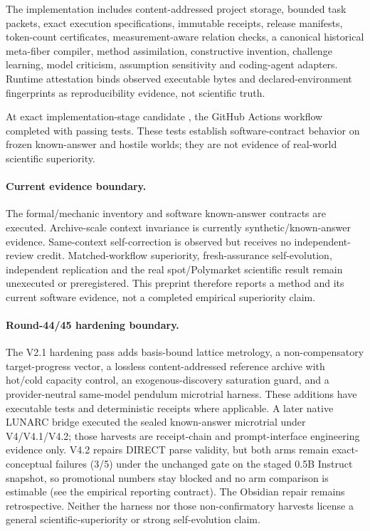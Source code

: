 The implementation includes content-addressed project storage, bounded task packets, exact execution specifications, immutable receipts, release manifests, token-count certificates, measurement-aware relation checks, a canonical historical meta-fiber compiler, method assimilation, constructive invention, challenge learning, model criticism, assumption sensitivity and coding-agent adapters. Runtime attestation binds observed executable bytes and declared-environment fingerprints as reproducibility evidence, not scientific truth.

At exact implementation-stage candidate \ImplementationSHA{}, the GitHub Actions workflow completed with \SoftwareTests{} passing tests. These tests establish software-contract behavior on frozen known-answer and hostile worlds; they are not evidence of real-world scientific superiority.

\paragraph{Current evidence boundary.} The formal/mechanic inventory and software known-answer contracts are executed. Archive-scale context invariance is currently synthetic/known-answer evidence. Same-context self-correction is observed but receives no independent-review credit. Matched-workflow superiority, fresh-assurance self-evolution, independent replication and the real spot/Polymarket scientific result remain unexecuted or preregistered. This preprint therefore reports a method and its current software evidence, not a completed empirical superiority claim.


\paragraph{Round-44/45 hardening boundary.}
The V2.1 hardening pass adds basis-bound lattice metrology, a non-compensatory target-progress vector, a lossless content-addressed reference archive with hot/cold capacity control, an exogenous-discovery saturation guard, and a provider-neutral same-model pendulum microtrial harness. These additions have executable tests and deterministic receipts where applicable. A later native LUNARC bridge executed the sealed known-answer microtrial under V4/V4.1/V4.2; those harvests are receipt-chain and prompt-interface engineering evidence only. V4.2 repairs DIRECT parse validity, but both arms remain exact-conceptual failures (3/5) under the unchanged gate on the staged 0.5B Instruct snapshot, so promotional numbers stay blocked and no arm comparison is estimable (see the empirical reporting contract). The Obsidian repair remains retrospective. Neither the harness nor those non-confirmatory harvests license a general scientific-superiority or strong self-evolution claim.

